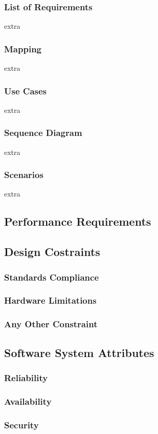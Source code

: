 \documentclass{article}
\begin{document}
		\subsubsection{List of Requirements}
		extra
		\subsubsection{Mapping}
		extra
		\subsubsection{Use Cases}
		extra
		\subsubsection{Sequence Diagram}
		extra
		\subsubsection{Scenarios}
		extra
	\subsection{Performance Requirements}
	\subsection{Design Costraints}
		\subsubsection{Standards Compliance}
		\subsubsection{Hardware Limitations}
		\subsubsection{Any Other Constraint}
	\subsection{Software System Attributes}
		\subsubsection{Reliability}
		\subsubsection{Availability}
		\subsubsection{Security}
\end{document}
